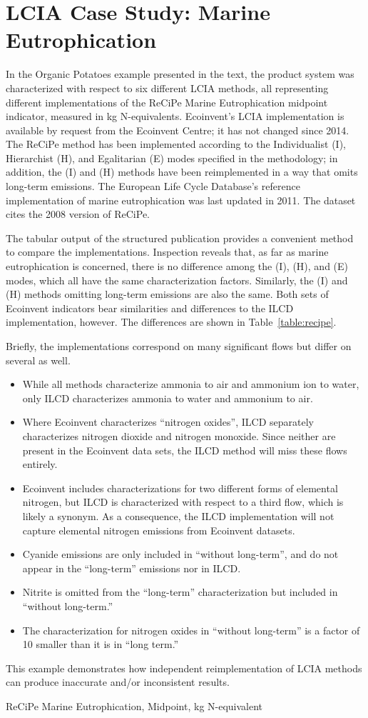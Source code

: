 \section{LCIA Case Study: Marine Eutrophication}

In the Organic Potatoes example presented in the text, the product system was characterized with respect to six different LCIA methods, all representing different implementations of the ReCiPe Marine Eutrophication midpoint indicator, measured in kg N-equivalents.  Ecoinvent's LCIA implementation is available by request from the Ecoinvent Centre; it has not changed since 2014. The ReCiPe method has been implemented according to the Individualist (I), Hierarchist (H), and Egalitarian (E) modes specified in the methodology; in addition, the (I) and (H) methods have been reimplemented in a way that omits long-term emissions.  The European Life Cycle Database's reference implementation of marine eutrophication was last updated in 2011.  The dataset cites the 2008 version of ReCiPe.

The tabular output of the structured publication provides a convenient method to compare the implementations. Inspection reveals that, as far as marine eutrophication  is concerned, there is no difference among the (I), (H), and (E) modes, which all have the same characterization factors.  Similarly, the (I) and (H) methods omitting long-term emissions are also the same.  Both sets of Ecoinvent indicators bear similarities and differences to the ILCD implementation, however.  The differences are shown in Table~\ref{table:recipe}.

Briefly, the implementations correspond on many significant flows but differ on several as well.
\begin{itemize}
\item While all methods characterize ammonia to air and ammonium ion to water, only ILCD characterizes ammonia to water and ammonium to air.
\item Where Ecoinvent characterizes ``nitrogen oxides'', ILCD separately characterizes nitrogen dioxide and nitrogen monoxide.  Since neither are present in the Ecoinvent data sets, the ILCD method will miss these flows entirely.
\item Ecoinvent includes characterizations for two different forms of elemental nitrogen, but ILCD is characterized with respect to a third flow, which is likely a synonym.  As a consequence, the ILCD implementation will not capture elemental nitrogen emissions from Ecoinvent datasets.
\item Cyanide emissions are only included in ``without long-term'', and do not appear in the ``long-term'' emissions nor in ILCD.
\item Nitrite is omitted from the ``long-term'' characterization but included in ``without long-term.''
\item The characterization for nitrogen oxides in ``without long-term'' is a factor of 10 smaller than it is in ``long term.''
\end{itemize}
This example demonstrates how independent reimplementation of LCIA methods can produce inaccurate and/or inconsistent results.

\begin{table}
  \footnotesize\sffamily
  \caption{ReCiPe Marine Eutrophication, Midpoint, kg N-equivalent}
  
\end{table}


